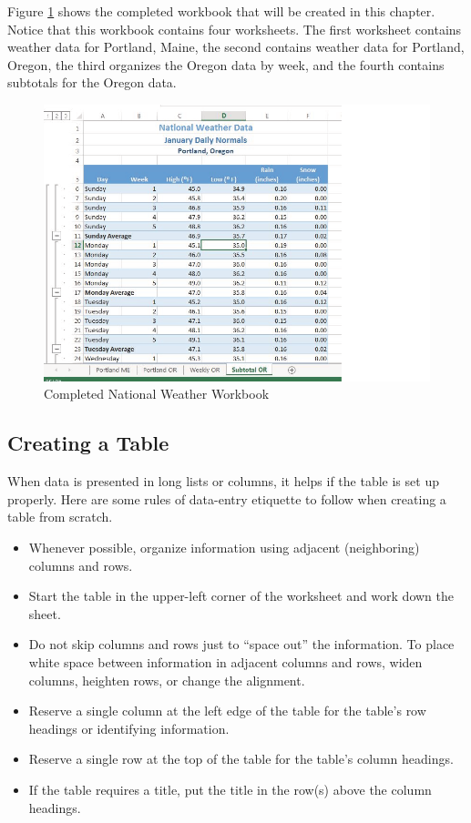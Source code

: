 Figure \ref{05:fig01} shows the completed workbook that will be created in this chapter. Notice that this workbook contains four worksheets. The first worksheet contains weather data for Portland, Maine, the second contains weather data for Portland, Oregon, the third organizes the Oregon data by week, and the fourth contains subtotals for the Oregon data.

\begin{figure}[H]
	\centering
	\includegraphics[width=\maxwidth{.95\linewidth}]{gfx/ch05_fig01}
	\caption{Completed National Weather Workbook}
	\label{05:fig01}
\end{figure}

\subsection{Creating a Table}

When data is presented in long lists or columns, it helps if the table is set up properly. Here are some rules of data-entry etiquette to follow when creating a table from scratch.

\begin{itemize}
	\item Whenever possible, organize information using adjacent (neighboring) columns and rows.
	\item Start the table in the upper-left corner of the worksheet and work down the sheet.
	\item Do not skip columns and rows just to ``space out'' the information. To place white space between information in adjacent columns and rows, widen columns, heighten rows, or change the alignment.
	\item Reserve a single column at the left edge of the table for the table's row headings or identifying information.
	\item Reserve a single row at the top of the table for the table's column headings.
	\item If the table requires a title, put the title in the row(s) above the column headings.
\end{itemize}

